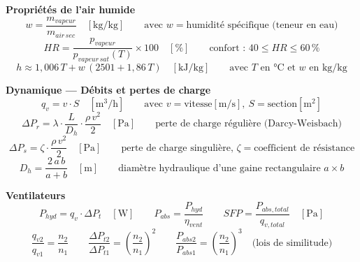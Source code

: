 \begin{tcolorbox}[
  enhanced, colback=FedBlue!3, colframe=FedBlue!50,
  fonttitle=\bfseries\sffamily, coltitle=FedBlue,
  title={FICHE MÉMO — Aéraulique}, boxrule=0.8pt, arc=2pt,
  width=\textwidth
]
\textbf{Propriétés de l'air humide}
\[
  w = \frac{m_{vapeur}}{m_{air\,sec}} \quad [\si{\kilogram\per\kilogram}]
  \qquad \text{avec } w = \text{humidité spécifique (teneur en eau)}
\]
\[
  HR = \frac{p_{vapeur}}{p_{vapeur\,sat}(T)} \times 100 \quad [\%]
  \qquad \text{confort : } 40 \leq HR \leq 60\,\%
\]
\[
  h \approx 1{,}006\,T + w\,(2501 + 1{,}86\,T) \quad [\si{\kilo\joule\per\kilogram}]
  \qquad \text{avec } T \text{ en °C et } w \text{ en kg/kg}
\]

\textbf{Dynamique — Débits et pertes de charge}
\[
  q_v = v \cdot S \quad [\si{\cubic\metre\per\hour}]
  \qquad \text{avec } v = \text{vitesse} [\si{\metre\per\second}],\ S = \text{section} [\si{\square\metre}]
\]
\[
  \Delta P_r = \lambda \cdot \frac{L}{D_h} \cdot \frac{\rho\,v^2}{2} \quad [\si{\pascal}]
  \qquad \text{perte de charge régulière (Darcy-Weisbach)}
\]
\[
  \Delta P_s = \zeta \cdot \frac{\rho\,v^2}{2} \quad [\si{\pascal}]
  \qquad \text{perte de charge singulière, } \zeta = \text{coefficient de résistance}
\]
\[
  D_h = \frac{2\,a\,b}{a+b} \quad [\si{\metre}]
  \qquad \text{diamètre hydraulique d'une gaine rectangulaire } a \times b
\]

\textbf{Ventilateurs}
\[
  P_{hyd} = q_v \cdot \Delta P_t \quad [\si{\watt}]
  \qquad P_{abs} = \frac{P_{hyd}}{\eta_{vent}}
  \qquad SFP = \frac{P_{abs,total}}{q_{v,total}} \quad [\si{\pascal}]
\]
\[
  \frac{q_{v2}}{q_{v1}} = \frac{n_2}{n_1} \qquad
  \frac{\Delta P_{t2}}{\Delta P_{t1}} = \left(\frac{n_2}{n_1}\right)^{\!2} \qquad
  \frac{P_{abs2}}{P_{abs1}} = \left(\frac{n_2}{n_1}\right)^{\!3}
  \quad \text{(lois de similitude)}
\]
\end{tcolorbox}

\finchapitre
